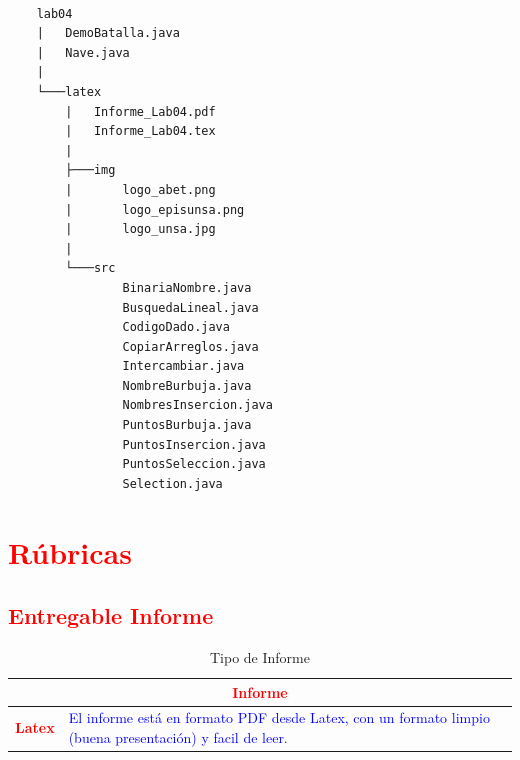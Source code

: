 \documentclass{article}
\begin{document}
\begin{lstlisting}[style=ascii-tree]

    lab04
    |   DemoBatalla.java
    |   Nave.java
    |
    └───latex
        |   Informe_Lab04.pdf
        |   Informe_Lab04.tex
        |
        ├───img
        |       logo_abet.png
        |       logo_episunsa.png
        |       logo_unsa.jpg
        |
        └───src
                BinariaNombre.java
                BusquedaLineal.java
                CodigoDado.java
                CopiarArreglos.java
                Intercambiar.java
                NombreBurbuja.java
                NombresInsercion.java
                PuntosBurbuja.java
                PuntosInsercion.java
                PuntosSeleccion.java
                Selection.java

\end{lstlisting}    

	\section{\textcolor{red}{Rúbricas}}
	
	\subsection{\textcolor{red}{Entregable Informe}}
	\begin{table}[H]
		\caption{Tipo de Informe}
		\setlength{\tabcolsep}{0.5em} %
		{\renewcommand{\arraystretch}{1.5}%
		\begin{tabular}{|p{3cm}|p{12cm}|}
			\hline
			\multicolumn{2}{|c|}{\textbf{\textcolor{red}{Informe}}}  \\
			\hline 
			\textbf{\textcolor{red}{Latex}} & \textcolor{blue}{El informe está en formato PDF desde Latex,  con un formato limpio (buena presentación) y facil de leer.}   \\ 
			\hline 
			
			
		\end{tabular}
	}
	\end{table}
	
	\clearpage
 
\end{document}

